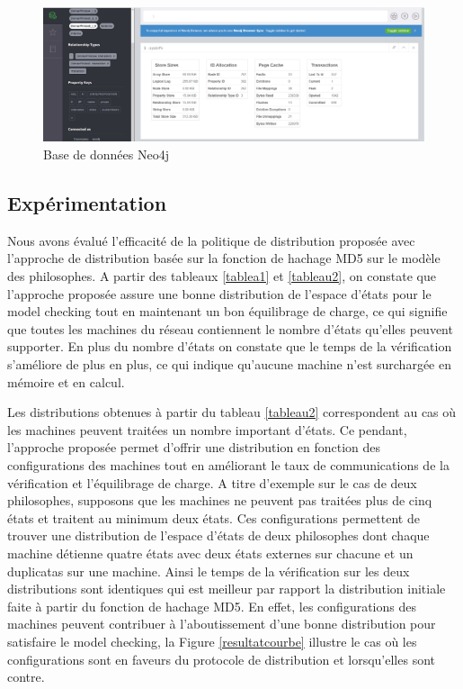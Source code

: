 \begin{figure} 
	\centering
	\includegraphics[width=1\linewidth]{img/bddneo4j}
	\caption{Base de données Neo4j} 
\end{figure}
\pagebreak
\subsection{Expérimentation}
Nous avons évalué l’efficacité de la politique de distribution proposée avec l’approche de distribution basée sur la fonction de hachage MD5 sur le modèle des philosophes. A partir des tableaux \ref{tablea1} et \ref{tableau2}, on constate que l’approche proposée assure une bonne distribution de l'espace d'états pour le model checking tout en maintenant un bon équilibrage de charge, ce qui signifie que toutes les machines du réseau contiennent le nombre d'états qu'elles peuvent supporter. En plus du nombre d'états on constate que le temps de la vérification s'améliore de plus en plus, ce qui indique qu’aucune machine n’est surchargée en mémoire et en calcul.

Les distributions obtenues à partir du tableau \ref{tableau2} correspondent au cas o\`{u} les machines peuvent traitées un nombre important d'états. Ce pendant, l'approche proposée permet d'offrir une distribution en fonction des configurations des machines tout en améliorant le taux de communications de la vérification et l'équilibrage de charge. A titre d'exemple sur le cas de deux philosophes, supposons que les machines ne peuvent pas traitées plus de cinq états et traitent au minimum deux états. Ces configurations permettent de trouver une distribution de l'espace d'états de deux philosophes dont chaque machine détienne quatre états avec deux états externes sur chacune et un duplicatas sur une machine. Ainsi le temps de la vérification sur les deux distributions sont identiques qui est meilleur par rapport la distribution initiale faite à partir du fonction de hachage MD5.
En effet, les configurations des machines peuvent contribuer à l'aboutissement d'une bonne distribution pour satisfaire le model checking, la Figure \ref{resultatcourbe} illustre le cas o\`{u} les configurations sont en faveurs du protocole de distribution et lorsqu'elles sont contre.


